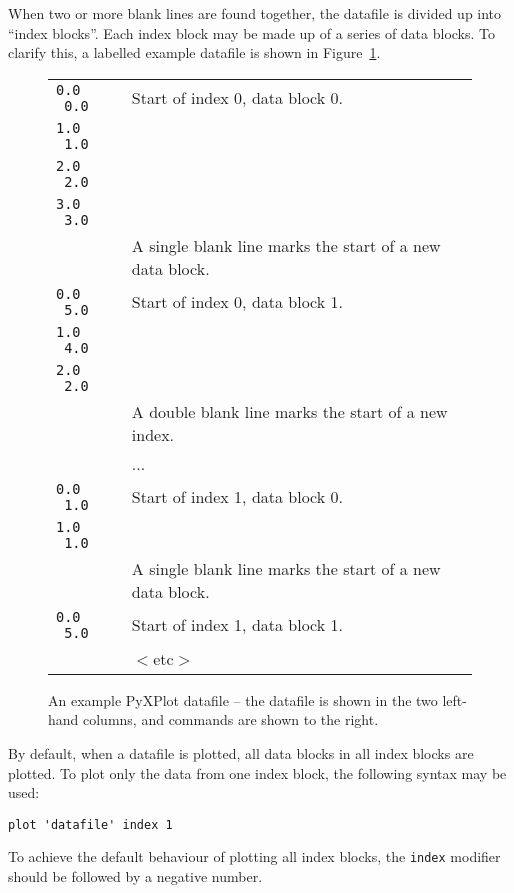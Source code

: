 \documentclass[a4paper,onecolumn,11pt]{book}
\begin{document}
When two or more blank lines are found together, the datafile is divided up
into ``index blocks''. Each index block may be made up of a series of data
blocks. To clarify this, a labelled example datafile is shown in
Figure~\ref{sample_datafile}.

\begin{figure}
\begin{tabular}{p{2.2cm}l}
\hline
\texttt{0.0 \ 0.0} & Start of index 0, data block 0. \\
\texttt{1.0 \ 1.0} & \\
\texttt{2.0 \ 2.0} & \\
\texttt{3.0 \ 3.0} & \\
                   & A single blank line marks the start of a new data block. \\
\texttt{0.0 \ 5.0} & Start of index 0, data block 1. \\
\texttt{1.0 \ 4.0} & \\
\texttt{2.0 \ 2.0} & \\
                   & A double blank line marks the start of a new index. \\
                   & ... \\
\texttt{0.0 \ 1.0} & Start of index 1, data block 0. \\
\texttt{1.0 \ 1.0} & \\
                   & A single blank line marks the start of a new data block. \\
\texttt{0.0 \ 5.0} & Start of index 1, data block 1. \\
                   & $<$etc$>$ \\
\hline
\end{tabular}
\caption{An example PyXPlot datafile -- the datafile is shown in the two left-hand columns, and commands are shown to the right.}
\label{sample_datafile}
\end{figure}

By default, when a datafile is plotted, all data blocks in all index blocks are
plotted. To plot only the data from one index block, the following syntax may
be used:

\begin{verbatim}
plot 'datafile' index 1
\end{verbatim}

\noindent To achieve the default behaviour of plotting all index blocks, the
\texttt{index} modifier should be followed by a negative number.
\end{document}
